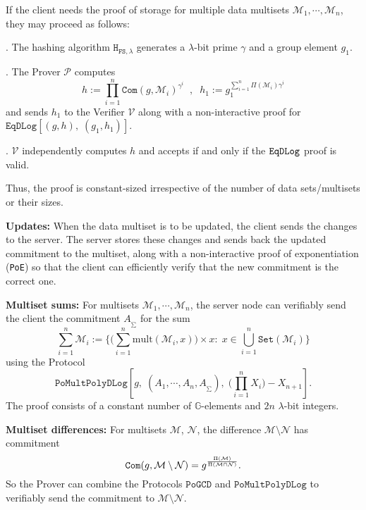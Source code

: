 \documentclass[11pt, lettersize, notitlepage, leqno, footskip=0.6cm]{article}
\newcommand{\pl}{\prod\limits}
\newcommand{\slim}{\sum\limits}
\newcommand{\ttt}{\texttt}
\newcommand{\sett}{\ttt{Set}}
\newcommand{\mul}{\mr{mult}}
\newcommand{\mc}{\mathcal}
\newcommand{\mb}{\mathbb}
\newcommand{\mr}{\mathrm}
\newcommand{\sm}{\setminus}
\newcommand{\lam}{\lambda}
\newcommand{\mP}{\mc{P}}
\newcommand{\V}{\mc{V}}
\newcommand{\mcM}{\mc{M}}
\newcommand{\vs}{\vspace{-0.15cm}}
\newcommand{\noin}{\noindent}
\numberwithin{equation}{section}
\begin{document}
If the client needs the proof of storage for multiple data multisets $\mc{M}_1,\cdots,\mc{M}_n$, they may proceed as follows: \vspace{0.1cm}

\noin 1. The hashing algorithm $\ttt{H}_{\ttt{FS},\lam}$ generates a $\lam$-bit prime $\gamma$ and a group element $g_1$.

\noin 2. The Prover $\mP$ computes \vs $$h:= \pl_{i=1}^n \ttt{Com}(g, \mcM_i)^{\gamma^i}\;\;,\;\;h_1:= g_1^{\slim_{i=1}^n \Pi(\mcM_i)\gamma^i}$$ and sends $h_1$ to the Verifier $\V$ along with a non-interactive proof for $\ttt{EqDLog}[(g,h),\;(g_1,h_1)]$.

\noin 3. $\V$ independently computes $h$ and accepts if and only if the $\tt{EqDLog}$ proof is valid.\vspace{0.1cm}


\noin Thus, the proof is constant-sized irrespective of the number of data sets/multisets or their sizes.



\vspace{0.2cm}

\noin \textbf{Updates:} When the data multiset is to be updated, the client sends the changes to the server. The server stores these changes and sends back the updated commitment to the multiset, along with a non-interactive proof of exponentiation (\verb|PoE|) so that the client can efficiently verify that the new commitment is the correct one. \vspace{0.15cm}

\noin \textbf{Multiset sums:} For multisets $\mc{M}_1,\cdots,\mc{M}_n$, the server node can verifiably send the client the commitment $A_{_{\sum}}$ for the sum \vs $$\sum\limits_{i=1}^n \mc{M}_i := \Big\{\big(\sum\limits_{i=1}^n \mul(\mc{M}_i, x)\big)\times x:\; x\in\bigcup\limits_{i=1}^n \sett(\mc{M}_i)\Big\} $$ using the Protocol \vspace{-0.3cm} $$\ttt{PoMultPolyDLog}[g,\; (A_1,\cdots,A_n,A_{_{\sum}}),\;\big(\pl_{i=1}^{n}X_i\big)-X_{n+1}].$$ The proof consists of a constant number of $\mb{G}$-elements and $2n$ $\lam$-bit integers.

\bigskip

\noin \textbf{Multiset differences:} For multisets $\mc{M}$, $\mc{N}$, the difference $\mc{M}\sm \mc{N} $ has commitment \vs $$\protect{\verb|Com|}(g, \mc{M}\sm \mc{N}) = g^{\frac{\Pi(\mcM)}{\Pi(\mcM\cap \mc{N})}} .$$ So the Prover can combine the Protocols $\ttt{PoGCD}$ and $\ttt{PoMultPolyDLog}$ to verifiably send the commitment to $\mc{M}\sm \mc{N} $. 
\end{document}
